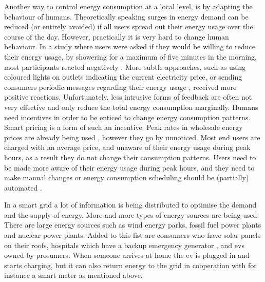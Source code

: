 Another way to control energy consumption at a local level, is by adapting the behaviour of humans. Theoretically speaking surges in energy demand can be reduced (or entirely avoided) if all users spread out their energy usage over the course of the day. However, practically it is very hard to change human behaviour. In a study where users were asked if they would be willing to reduce their energy usage, by showering for a maximum of five minutes in the morning, most participants reacted negatively \cite{GouldenBedwellRennick-EgglestoneEtAl2014}. More subtle approaches, such as using coloured lights on outlets indicating the current electricity price, or sending consumers periodic messages regarding their energy usage \cite{AyresRasemanShih2012}, received more positive reactions. Unfortunately, less intrusive forms of feedback are often not very effective and only reduce the total energy consumption marginally. Humans need incentives in order to be enticed to change energy consumption patterns. Smart pricing is a form of such an incentive. Peak rates in wholesale energy prices are already being used \cite{SamadiMohsenian-RadSchoberEtAl2012}, however they go by unnoticed. Most end users are charged with an average price, and unaware of their energy usage during peak hours, as a result they do not change their consumption patterns. Users need to be made more aware of their energy usage during peak hours, and they need to make manual changes \cite{Mohsenian-RadLeon-Garcia2010} or energy consumption scheduling should be (partially) automated \cite{SamadiMohsenian-RadSchoberEtAl2012}.

In a smart grid a lot of information is being distributed to optimise the demand and the supply of energy. More and more types of energy sources are being used. There are large energy sources such as wind energy parks, fossil fuel power plants and nuclear power plants. Added to this list are consumers who have solar panels on their roofs, hospitals which have a backup emergency generator \cite{Kumagai2012}, and \acp{ev} owned by prosumers. When someone arrives at home the \ac{ev} is plugged in and starts charging, but it can also return energy to the grid in cooperation with for instance a smart meter as mentioned above.

